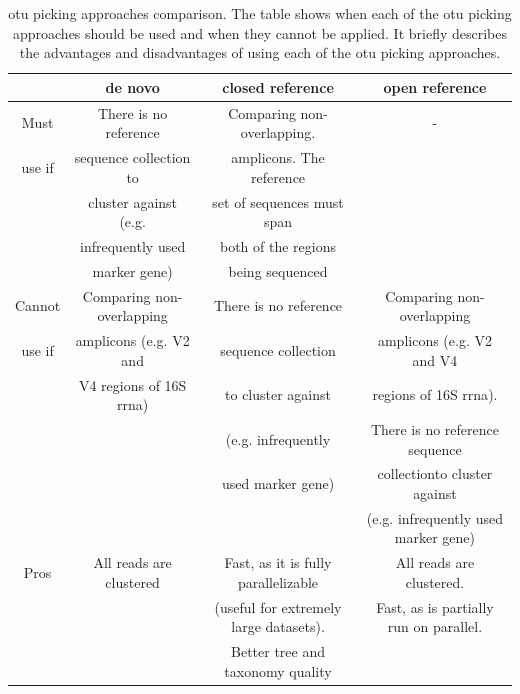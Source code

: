 \begin{table}
\centering
\caption[\gls{otu} picking approaches comparison. The table shows when each of the \gls{otu} picking approaches should be used and when they cannot be applied. It briefly describes the advantages and disadvantages of using each of the \gls{otu} picking approaches.]{\gls{otu} picking approaches comparison. The table shows when each of the \gls{otu} picking approaches should be used and when they cannot be applied. It briefly describes the advantages and disadvantages of using each of the \gls{otu} picking approaches.}\label{btable3}
\renewcommand{\arraystretch}{0.5}%
\begin{tabular*}{\textwidth}{cccc}
& de novo & closed reference & open reference\\
\toprule
Must   & There is no reference          & Comparing non-overlapping. & -\\
use if & sequence collection to         & amplicons. The reference & \\
       & cluster against (e.g.          & set of sequences must span & \\
       & infrequently used              & both of the regions & \\
       & marker gene)                   & being sequenced & \\
\midrule
Cannot & Comparing non-overlapping   & There is no reference    & Comparing non-overlapping \\
use if & amplicons (e.g. V2 and      & sequence collection      & amplicons (e.g. V2 and V4\\
       &  V4 regions of 16S \gls{rrna})    & to cluster against       & regions of 16S \gls{rrna}). \\
       &                             & (e.g. infrequently       & There is no reference sequence\\
       &                             & used marker gene)        & collectionto cluster against \\
       &                             &                          & (e.g. infrequently used marker gene)\\
\midrule
Pros & All reads are clustered & Fast, as it is fully parallelizable    & All reads are clustered.\\
     &                         & (useful for extremely large datasets). & Fast, as is partially run on parallel.\\
     &                         & Better tree and taxonomy quality & \\

\end{tabular*}
\end{table}
